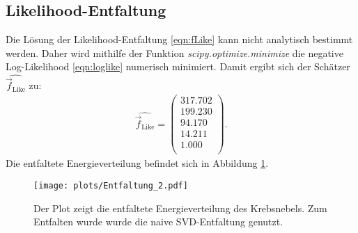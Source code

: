 \subsection{Likelihood-Entfaltung}
Die Lösung der Likelihood-Entfaltung \eqref{eqn:fLike} kann nicht analytisch bestimmt werden. Daher wird mithilfe der Funktion \textit{scipy.optimize.minimize} die negative Log-Likelihood \eqref{eqn:loglike} numerisch minimiert. Damit ergibt sich der Schätzer $\hat{\vec{f}_{\text{Like}}}$ zu:\\
\begin{align*}
	\hat{\vec{f}_{\text{Like}}} = \begin{pmatrix}
			317.702\\
			199.230\\
			94.170\\
			14.211\\
			1.000\\
	\end{pmatrix}.
\end{align*}
Die entfaltete Energieverteilung befindet sich in Abbildung \ref{fig:E2}.
\begin{figure}
  \centering
  \texttt{[image: plots/Entfaltung\_2.pdf]}
  \caption{Der Plot zeigt die entfaltete Energieverteilung des Krebsnebels. Zum Entfalten wurde wurde die naive SVD-Entfaltung genutzt.}
  \label{fig:E2}
\end{figure}
